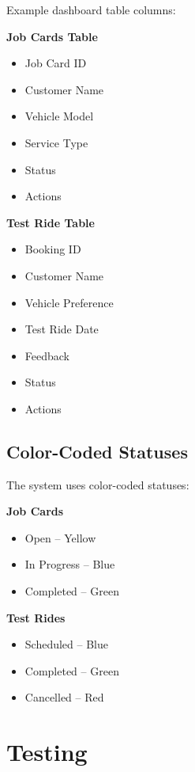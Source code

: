 \documentclass[12pt,a4paper]{report}
\begin{document}
Example dashboard table columns:

\textbf{Job Cards Table}

\begin{itemize}
\item Job Card ID
\item Customer Name
\item Vehicle Model
\item Service Type
\item Status
\item Actions
\end{itemize}

\textbf{Test Ride Table}

\begin{itemize}
\item Booking ID
\item Customer Name
\item Vehicle Preference
\item Test Ride Date
\item Feedback
\item Status
\item Actions
\end{itemize}

\section{Color-Coded Statuses}

The system uses color-coded statuses:

\textbf{Job Cards}

\begin{itemize}
\item Open -- Yellow
\item In Progress -- Blue
\item Completed -- Green
\end{itemize}

\textbf{Test Rides}

\begin{itemize}
\item Scheduled -- Blue
\item Completed -- Green
\item Cancelled -- Red
\end{itemize}

\chapter{Testing}
\end{document}
